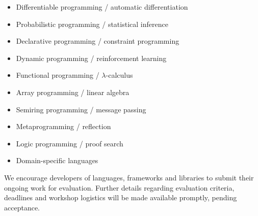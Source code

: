 \documentclass{article}
\begin{document}
    \begin{itemize}
      \item Differentiable programming / automatic differentiation
      \item Probabilistic programming / statistical inference
      \item Declarative programming / constraint programming
      \item Dynamic programming / reinforcement learning
      \item Functional programming / $\lambda$-calculus
      \item Array programming / linear algebra
      \item Semiring programming / message passing
      \item Metaprogramming / reflection
      \item Logic programming / proof search
      \item Domain-specific languages
    \end{itemize}

    We encourage developers of languages, frameworks and libraries to submit their ongoing work for evaluation. Further details regarding evaluation criteria, deadlines and workshop logistics will be made available promptly, pending acceptance.
\end{document}
